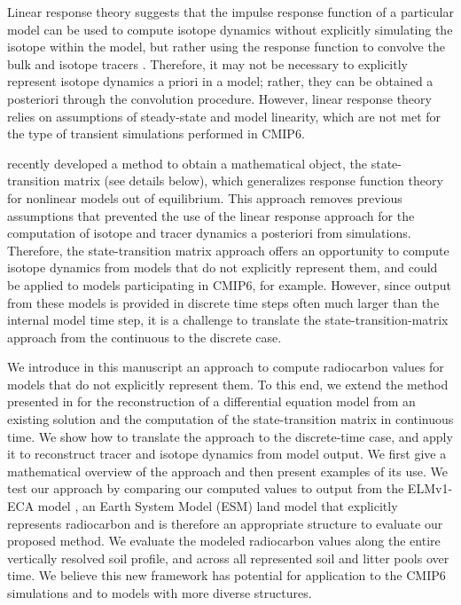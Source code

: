 \documentclass[11pt,a4paper]{article}
\begin{document}
Linear response theory suggests that the impulse response function of a particular model can be used to compute isotope dynamics without explicitly simulating the isotope within the model, but rather using the response function to convolve the bulk and isotope tracers \citep{Thompson1999}. Therefore, it may not be necessary to explicitly represent isotope dynamics a priori in a model; rather, they can be obtained a posteriori through the convolution procedure. However, linear response theory relies on assumptions of steady-state and model linearity, which are not met for the type of transient simulations performed in CMIP6. 

\citet{Metzler2018PNAS} recently developed a method to obtain a mathematical object, the state-transition matrix (see details below), which generalizes response function theory for nonlinear models out of equilibrium. This approach removes previous assumptions that prevented the use of the linear response approach for the computation of isotope and tracer dynamics a posteriori from simulations. Therefore, the state-transition matrix approach offers an opportunity to compute isotope dynamics from models that do not explicitly represent them, and could be applied to models participating in CMIP6, for example. However, since output from these models is provided in discrete time steps often much larger than the internal model time step, it is a challenge to translate the state-transition-matrix approach from the continuous to the discrete case.

We introduce in this manuscript an approach to compute radiocarbon values for models that do not explicitly represent them. To this end, we extend the method presented in \citet{Metzler2018PNAS} for the reconstruction of a differential equation model from an existing solution and the computation of the state-transition matrix in continuous time. We show how to translate the approach to the discrete-time case, and apply it to reconstruct tracer and isotope dynamics from model output. We first give a mathematical overview of the approach and then present examples of its use. We test our approach by comparing our computed values to output from the ELMv1-ECA model \citep{Zhu2019, Riley2018,Chen2009JGR, Tang2018EI}, an Earth System Model (ESM) land model that explicitly represents radiocarbon and is therefore an appropriate structure to evaluate our proposed method. We evaluate the modeled radiocarbon values along the entire vertically resolved soil profile, and across all represented soil and litter pools over time. We believe this new framework has  potential for application to the CMIP6 simulations and to models with more diverse structures.
\end{document}
